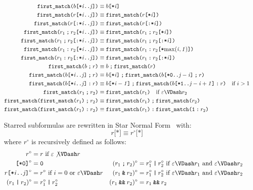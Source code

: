 \documentclass[a4paper,twoside,10pt,DIV=12]{scrreprt}
\newcommand{\OR}{\mathbin{\texttt{|}}}
\newcommand{\AND}{\mathbin{\texttt{\&}}}
\newcommand{\ANDALT}{\mathbin{\texttt{\&\&}}}
\newcommand{\FUSION}{\mathbin{\texttt{:}}}
\newcommand{\CONCAT}{\mathbin{\texttt{;}}}
\newcommand{\0}{\texttt{0}}
\newcommand{\1}{\texttt{1}}
\newcommand{\STAR}[1]{\texttt{[*#1]}}
\newcommand{\FSTAR}[1]{\texttt{[:*#1]}}
\newcommand{\FIRSTMATCH}{\texttt{first\_match}}
\newcommand{\eword}{\texttt{[*0]}}
\newcommand\mvar[1]{\ensuremath{\mathit{#1}}}
\newcommand\code[1]{\texttt{#1}}
\begin{document}
\begin{align*}
  \FIRSTMATCH\code(b\STAR{\mvar{i}..\mvar{j}}\code) &\equiv b\STAR{\mvar{i}} \\
  \FIRSTMATCH\code(r\STAR{\mvar{i}..\mvar{j}}\code) &\equiv \FIRSTMATCH\code(r\STAR{\mvar{i}}\code) \\
  \FIRSTMATCH\code(r\FSTAR{\mvar{i}..\mvar{j}}\code) &\equiv \FIRSTMATCH\code(r\FSTAR{\mvar{i}}\code) \\
  \FIRSTMATCH\code(r_1\CONCAT{}r_2\STAR{\mvar{i}..\mvar{j}}\code) &\equiv \FIRSTMATCH\code(r_1\CONCAT{}r_2\STAR{\mvar{i}}\code) \\
  \FIRSTMATCH\code(r_1\CONCAT{}r_2\FSTAR{\mvar{i}..\mvar{j}}\code) &\equiv \FIRSTMATCH\code(r_1\CONCAT{}r_2\FSTAR{\mvar{i}}\code) \\
  \FIRSTMATCH\code(r_1\FUSION{}r_2\STAR{\mvar{i}..\mvar{j}}\code) &\equiv \FIRSTMATCH\code(r_1\FUSION{}r_2\STAR{\mvar{\max(i,1)}}\code) \\
  \FIRSTMATCH\code(r_1\FUSION{}r_2\FSTAR{\mvar{i}..\mvar{j}}\code) &\equiv \FIRSTMATCH\code(r_1\FUSION{}r_2\FSTAR{\mvar{i}}\code) \\
  \FIRSTMATCH\code(b\CONCAT{}r\code) &\equiv b\CONCAT\FIRSTMATCH\code(r\code) \\
  \FIRSTMATCH\code(b\STAR{\mvar{i}..\mvar{j}}\CONCAT{}r\code) &\equiv b\STAR{\mvar{i}}\CONCAT\FIRSTMATCH\code(b\STAR{0..\mvar{j-i}}\CONCAT r\code) \\
  \FIRSTMATCH\code(b\STAR{\mvar{i}..\mvar{j}}\FUSION{}r\code) &\equiv b\STAR{\mvar{i-1}}\CONCAT\FIRSTMATCH\code(b\STAR{1..\mvar{j-i+1}}\FUSION r\code)\quad\text{if~}i>1\\
  \FIRSTMATCH\code(r_1\CONCAT{}r_2\code) &\equiv\FIRSTMATCH\code(r_1\code)\quad\text{if~} \varepsilon\VDash r_2\\
  \FIRSTMATCH\code(\FIRSTMATCH\code(r_1\code)\CONCAT{}r_2\code) &\equiv\FIRSTMATCH\code(r_1\code)\CONCAT\FIRSTMATCH\code(r_2\code)\\
  \FIRSTMATCH\code(\FIRSTMATCH\code(r_1\code)\FUSION{}r_2\code) &\equiv\FIRSTMATCH\code(r_1\code)\FUSION\FIRSTMATCH\code(\1\FUSION{}r_2\code)
\end{align*}

Starred subformulas are rewritten in Star Normal
Form~\cite{bruggeman.96.tcs} with:
\[r\STAR{} \equiv r^\circ\STAR{} \]
where $r^\circ$ is recursively defined as follows:
\begin{align*}
  r^\circ &= r\text{~if~} \varepsilon\not\VDash r \\
  \eword^\circ &= \0 &
  (r_1\CONCAT r_2)^\circ &= r_1^\circ\OR r_2^\circ \text{~if~} \varepsilon\VDash r_1\text{~and~}\varepsilon\VDash r_2\\
  r\STAR{\mvar{i}..\mvar{j}}^\circ &= r^\circ \text{~if~} i=0 \text{~or~} \varepsilon\VDash r&
  (r_1\AND r_2)^\circ &= r_1^\circ\OR r_2^\circ \text{~if~} \varepsilon\VDash r_1\text{~and~}\varepsilon\VDash r_2\\
  (r_1\OR r_2)^\circ &= r_1^\circ \OR r_2^\circ &
  (r_1\ANDALT r_2)^\circ &= r_1 \ANDALT r_2
\end{align*}
\end{document}
